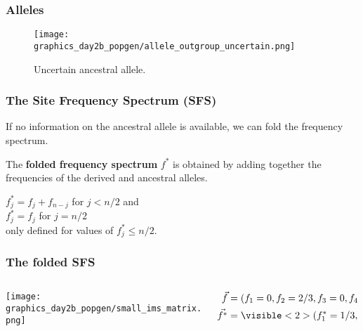 \documentclass{beamer}
\newcommand{\1}{\ensuremath{\mathbf{1}}}
\begin{document}
%
%
%
\begin{frame}\frametitle{Alleles}
	\begin{figure}
	\begin{center}
		\texttt{[image: graphics\_day2b\_popgen/allele\_outgroup\_uncertain.png]}
	\end{center}
	\caption{Uncertain ancestral allele.}
	\end{figure}
\end{frame}
%
%
%
\begin{frame}\frametitle{The Site Frequency Spectrum (SFS)}
	If no information on the ancestral allele is available, we can fold the frequency spectrum.
	\begin{block}{}
		The \textbf{folded frequency spectrum} $f^*$ is obtained by adding together the frequencies of the derived and ancestral alleles.
	\end{block}
	$f^*_j = f_j+f_{n-j}$ for $j<n/2$ and\\
	$f^*_j = f_j$ for $j=n/2$\\
	only defined for values of $f^*_j \leq n/2$.
\end{frame}
%
%
%
\begin{frame}\frametitle{The folded SFS}
	\begin{columns}
	\begin{column}{0.25\textwidth}
	\begin{center}
		\texttt{[image: graphics\_day2b\_popgen/small\_ims\_matrix.png]}
	\end{center}
	\end{column}
	\begin{column}{0.75\textwidth}
		\begin{equation}
			\begin{split}
				\vec{f} & = (f_1=0, f_2=2/3, f_3=0, f_4=1/3)\\
				\vec{f^*} & = \visible<2>{(f_1^* = 1/3, f_2^* = 2/3)}\\
			\end{split}
		\end{equation}
	\end{column}
	\end{columns}
\end{frame}
\end{document}
